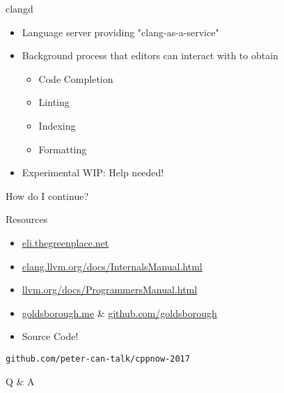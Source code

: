 
\begin{slide}{}
  {\fontsize{36}{36}\selectfont clangd}
  \vspace{0.75cm}

  \begin{itemize}
    \item Language server providing "clang-as-a-service"
    \item Background process that editors can interact with to obtain
      \begin{itemize}
        \item Code Completion
        \item Linting
        \item Indexing
        \item Formatting
      \end{itemize}
    \item Experimental WIP: Help needed!
  \end{itemize}
\end{slide}

\begin{slide}{}
  \fontsize{32}{32}\selectfont
  \color{llvmblue}
  How do I continue?
\end{slide}

\begin{slide}{Resources}
  \begin{itemize}
      \item \url{eli.thegreenplace.net}
      \item \url{clang.llvm.org/docs/InternalsManual.html}
      \item \url{llvm.org/docs/ProgrammersManual.html}
      \item \url{goldsborough.me} \& \url{github.com/goldsborough}
      \item Source Code!
  \end{itemize}
  \pause
  \vspace{0.75cm}
  \texttt{github.com/peter-can-talk/cppnow-2017}
\end{slide}

\begin{slide}{}
  \vspace{0.5cm}
  \fontsize{48}{48}\selectfont
  \color{llvmblue}
  Q \& A
\end{slide}
